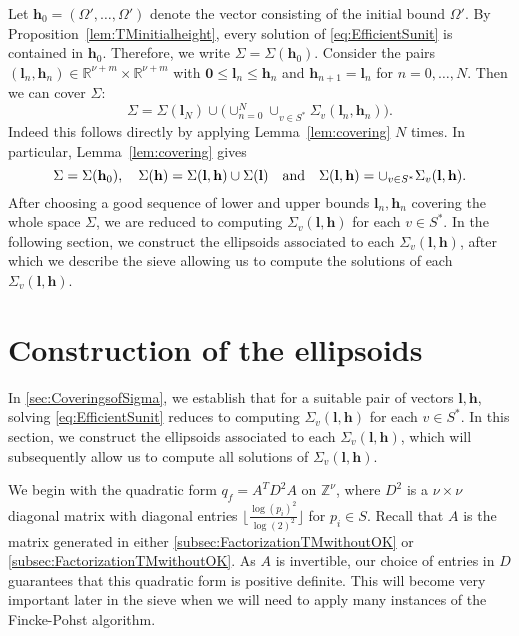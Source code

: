 Let $\mathbf{h}_0 = (\Omega', \dots, \Omega')$ denote the vector consisting of the initial bound $\Omega'$. By Proposition~\ref{lem:TMinitialheight}, every solution of \eqref{eq:EfficientSunit} is contained in $\mathbf{h}_0$. Therefore, we write $\Sigma = \Sigma(\mathbf{h}_0)$. Consider the pairs $(\mathbf{l}_n,\mathbf{h}_n)\in \mathbb{R}^{\nu + m}\times \mathbb{R}^{\nu + m}$ with $\mathbf{0}\leq \mathbf{l}_n\leq \mathbf{h}_n$ and $\mathbf{h}_{n+1}=\mathbf{l}_{n}$ for $n=0,\dotsc,N$. Then we can cover $\Sigma$: 
$$\Sigma=\Sigma(\mathbf{l}_{N})\cup\bigl(\cup_{n=0}^{N}\cup_{v\in S^*}\Sigma_v(\mathbf{l}_n,\mathbf{h}_n)\bigl).$$
Indeed this follows directly by applying Lemma~\ref{lem:covering} $N$ times. In particular, Lemma~\ref{lem:covering} gives  $$\Sigma=\Sigma(\mathbf{h}_0), \quad \Sigma(\mathbf{h})=\Sigma(\mathbf{l},\mathbf{h})\cup \Sigma(\mathbf{l}) \quad \textnormal{and} \quad \Sigma(\mathbf{l},\mathbf{h})=\cup_{v\in S^*}\Sigma_v(\mathbf{l},\mathbf{h}).$$
After choosing a good sequence of lower and upper bounds $\mathbf{l}_n,\mathbf{h}_n$ covering the whole space $\Sigma$, we are reduced to computing $\Sigma_v(\mathbf{l},\mathbf{h})$ for each $v \in S^*$. In the following section, we construct the ellipsoids associated to each $\Sigma_v(\mathbf{l},\mathbf{h})$, after which we describe the sieve allowing us to compute the solutions of each $\Sigma_v(\mathbf{l},\mathbf{h})$. 



\section{Construction of the ellipsoids}
\label{sec:ConstructionofEllipsoids}

In \autoref{sec:CoveringsofSigma}, we establish that for a suitable pair of vectors $\mathbf{l}, \mathbf{h}$, solving \eqref{eq:EfficientSunit} reduces to computing $\Sigma_v(\mathbf{l},\mathbf{h})$ for each $v \in S^*$. In this section, we construct the ellipsoids associated to each $\Sigma_v(\mathbf{l},\mathbf{h})$, which will subsequently allow us to compute all solutions of $\Sigma_v(\mathbf{l},\mathbf{h})$. 

We begin with the quadratic form $q_f=A^TD^2A$ on $\mathbb{Z}^{\nu}$, where $D^2$ is a $\nu \times \nu$ diagonal matrix with diagonal entries $\lfloor\frac{\log(p_i)^2}{\log(2)^2}\rfloor$ for $p_i \in S$. Recall that $A$ is the matrix generated in either \autoref{subsec:FactorizationTMwithoutOK} or \autoref{subsec:FactorizationTMwithoutOK}. As $A$ is invertible, our choice of entries in $D$ guarantees that this quadratic form is positive definite. This will become very important later in the sieve when we will need to apply many instances of the Fincke-Pohst algorithm. 

